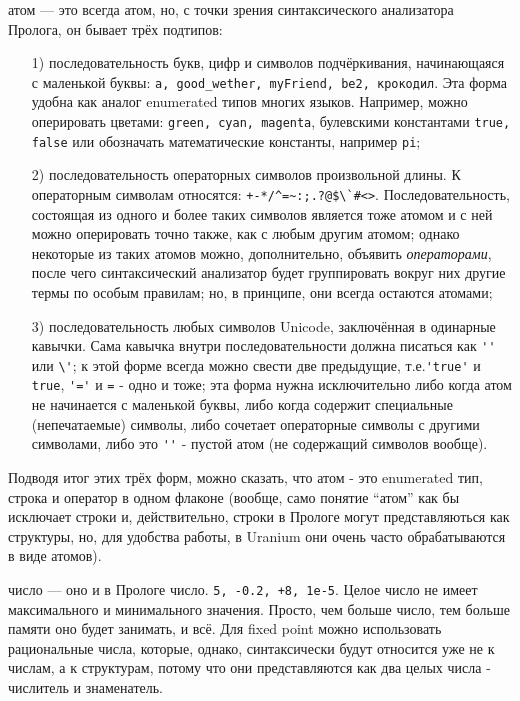 \documentclass[a4paper]{book}
\def\te{т.\thinspace е.}
\def\ur{Uranium}
\begin{document}
\begin{description}
\item атом --- это всегда атом, но, с точки зрения синтаксического
  анализатора Пролога, он бывает трёх подтипов:
  \begin{itemize}
    \item[1)] последовательность букв, цифр и символов
      подчёркивания, начинающаяся с маленькой буквы:
      \verb|a, good_wether, myFriend, be2, крокодил|. Эта форма
      удобна как аналог enumerated типов многих языков. Например,
      можно оперировать цветами: \verb|green, cyan, magenta|,
      булевскими константами \verb|true, false| или обозначать
      математические константы, например \verb|pi|;
    \item[2)] последовательность операторных символов
      произвольной длины. К операторным символам относятся:
      \verb|+-*/^=~:;.?@$\`#<>|. Последовательность, состоящая из
      одного и более таких символов является тоже атомом и с ней
      можно оперировать точно также, как с любым другим атомом;
      однако некоторые из таких атомов можно, дополнительно,
      объявить {\it операторами\/}, после чего синтаксический
      анализатор будет группировать вокруг них другие термы по
      особым правилам; но, в принципе, они всегда остаются атомами;
    \item[3)] последовательность любых символов Unicode,
      заключённая в одинарные кавычки. Сама кавычка внутри
      последовательности должна писаться как \verb|''| или
      \verb|\'|; к этой форме всегда можно свести две предыдущие,
      \te \verb|'true'| и \verb|true|, \verb|'='| и \verb|=| -
      одно и тоже; эта форма нужна исключительно либо когда атом
      не начинается с маленькой буквы, либо когда содержит
      специальные (непечатаемые) символы, либо сочетает
      операторные символы с другими символами, либо это \verb|''|
      - пустой атом (не содержащий символов вообще). 
  \end{itemize}
  Подводя итог этих трёх форм, можно сказать, что атом - это
  enumerated тип, строка и оператор в одном флаконе (вообще, само
  понятие ``атом'' как бы исключает строки и, действительно,
  строки в Прологе могут представляються как структуры, но,
  для удобства работы, в \ur{} они очень часто обрабатываются в
  виде атомов).

  \item число --- оно и в Прологе
    число. \verb|5, -0.2, +8, 1e-5|. Целое число не имеет
    максимального и минимального значения. Просто, чем больше
    число, тем больше памяти оно будет занимать, и всё. Для fixed
    point можно использовать рациональные числа, которые, однако,
    синтаксически будут относится уже не к числам, а к
    структурам, потому что они представляются как два целых числа
    - числитель и знаменатель.


\end{description}
\end{document}
